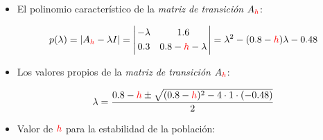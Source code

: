 
\subsection{}

\begin{frame}%
	
	\begin{itemize}

		\item El polinomio característico de la \textit{matriz de transición} $A_{\color{red}h}$:
		
		\vspace{-1mm}
		\[	
		p(\lambda)
		=
		|A_{\color{red}h}-\lambda I|
		=
		\left|	
		\begin{array}{@{\hspace{0.2\tabcolsep}}c@{\hspace{1.6\tabcolsep}}c@{\hspace{0.2\tabcolsep}}}
		-\lambda & 1.6 \\[1mm]
		0.3 & 0.8-{\color{red}h}-\lambda
		\end{array}
		\right| 
		=
		\lambda^2 - (0.8-{\color{red}h})\lambda - 0.48	
		\]
		
		\vspace{2mm}
		\item Los valores propios de la \textit{matriz de transición} $A_{{\color{red}h}}$:
		
		\vspace{1mm}
		\[	
		\lambda = \frac{0.8-{\color{red}h} \pm \sqrt{( 0.8-{\color{red}h} )^2 - 4\cdot 1\cdot (-0.48) }}{2}
		\]
		
		\vspace{2mm}
		\item Valor de ${\color{red}h}$ para la estabilidad de la población:
		

\end{itemize}
\end{frame}
